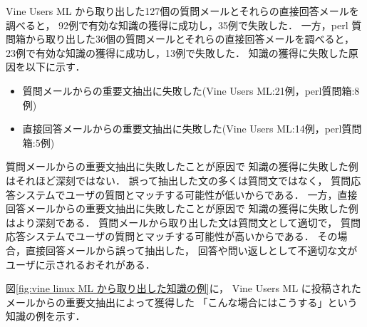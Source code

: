 Vine Users ML から取り出した127個の質問メールとそれらの直接回答メールを調べると，
92例で有効な知識の獲得に成功し，35例で失敗した．
一方，perl 質問箱から取り出した36個の質問メールとそれらの直接回答メールを調べると，
23例で有効な知識の獲得に成功し，13例で失敗した．
知識の獲得に失敗した原因を以下に示す．
\begin{itemize}
 \item 質問メールからの重要文抽出に失敗した(Vine Users ML:21例，perl質問箱:8例)

 \item 直接回答メールからの重要文抽出に失敗した(Vine Users ML:14例，perl質問箱:5例)
\end{itemize}
質問メールからの重要文抽出に失敗したことが原因で
知識の獲得に失敗した例はそれほど深刻ではない．
誤って抽出した文の多くは質問文ではなく，
質問応答システムでユーザの質問とマッチする可能性が低いからである．
一方，直接回答メールからの重要文抽出に失敗したことが原因で
知識の獲得に失敗した例はより深刻である．
質問メールから取り出した文は質問文として適切で，
質問応答システムでユーザの質問とマッチする可能性が高いからである．
その場合，直接回答メールから誤って抽出した，
回答や問い返しとして不適切な文がユーザに示されるおそれがある．


図\ref{fig:vine linux ML から取り出した知識の例}に，
Vine Users ML に投稿されたメールからの重要文抽出によって獲得した
「こんな場合にはこうする」という知識の例を示す．

